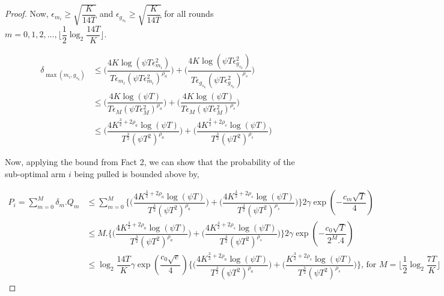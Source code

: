 \begin{proof}
Now, $\epsilon_{m_{i}}\geq \sqrt{\dfrac{K}{14 T}}$ and $\epsilon_{g_{s_{k}}}\geq \sqrt{\dfrac{K}{14 T}}$ for all rounds $m=0,1,2,...,\big \lfloor \dfrac{1}{2}\log_{2} \dfrac{14 T}{K}\big\rfloor$.

\begin{align*}
\delta_{\max(m_{i},g_{s_{k}})} &\leq \bigg(\dfrac{4K\log (\psi T \epsilon_{m_{i}}^{2})}{T\epsilon_{m_{i}}(\psi T\epsilon_{m_{i}}^{2})^{\rho_{a}}}\bigg) + \bigg(\dfrac{4K\log (\psi T \epsilon_{g_{s_{k}}}^{2})}{T\epsilon_{g_{s_{k}}}(\psi  T\epsilon_{g_{s_{k}}}^{2})^{\rho_{s}}}\bigg)\\
& \leq \bigg(\dfrac{4K\log (\psi T )}{T\epsilon_{M}(\psi T\epsilon_{M}^{2})^{\rho_{a}}}\bigg) + \bigg(\dfrac{4K\log (\psi T )}{T\epsilon_{M}(\psi  T\epsilon_{M}^{2})^{\rho_{s}}}\bigg)\\
& \leq \bigg(\dfrac{4K^{\frac{3}{2} +2\rho_a}\log (\psi T )}{T^{\frac{3}{2}}(\psi T^2)^{\rho_{a}}}\bigg) + \bigg(\dfrac{4K^{\frac{3}{2} +2\rho_s}\log (\psi T )}{T^{\frac{3}{2}}(\psi T^2)^{\rho_{s}}}\bigg)
\end{align*}

Now, applying the bound from Fact 2, we can show that the probability of the sub-optimal arm $i$ being pulled is bounded above by,

\begin{align*}
P_{i} = \sum_{m=0}^{M} \delta_{m}.Q_{m} &\leq \sum_{m=0}^{M} \bigg\lbrace\bigg(\dfrac{4K^{\frac{3}{2} +2\rho_a}\log (\psi T )}{T^{\frac{3}{2}}(\psi T^2)^{\rho_{a}}}\bigg) + \bigg(\dfrac{4K^{\frac{3}{2} +2\rho_{s}}\log (\psi T )}{T^{\frac{3}{2}}(\psi T^2)^{\rho_{s}}}\bigg)\bigg\rbrace 2\gamma \exp(-\dfrac{c_{m}\sqrt{T}}{4})\\
& \leq M.\bigg\lbrace\bigg(\dfrac{4K^{\frac{3}{2} +2\rho_a}\log (\psi T )}{T^{\frac{3}{2}}(\psi T^2)^{\rho_{a}}}\bigg) + \bigg(\dfrac{4K^{\frac{3}{2} +2\rho_{s}}\log (\psi T )}{T^{\frac{3}{2}}(\psi T^2)^{\rho_{s}}}\bigg)\bigg\rbrace 2\gamma \exp(-\dfrac{c_{0}\sqrt{T}}{2^{M}.4})\\
& \leq \log_{2}\dfrac{14T}{K}\gamma \exp(\dfrac{c_{0}\sqrt{e}}{4})\bigg\lbrace\bigg(\dfrac{4K^{\frac{3}{2} +2\rho_{a}}\log (\psi T )}{T^{\frac{3}{2}}(\psi T^2)^{\rho_{a}}}\bigg) + \bigg(\dfrac{K^{\frac{3}{2} +2\rho_{s}}\log (\psi T )}{T^{\frac{3}{2}}(\psi T^2)^{\rho_{s}}}\bigg)\bigg\rbrace \text{, for $M=\big \lfloor \dfrac{1}{2}\log_{2} \dfrac{7T}{K}\big\rfloor$}
\end{align*}


\end{proof}
